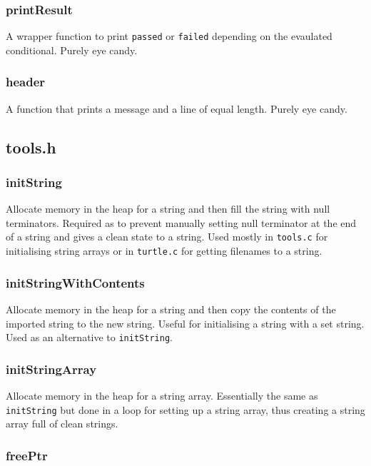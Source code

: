 \documentclass[a4paper, 12pt, titlepage]{article}
\newcommand{\code}[1]{\small\texttt{#1}\normalsize}
\begin{document}
\subsubsection{printResult}

A wrapper function to print \code{passed} or \code{failed} depending on the 
evaulated conditional. Purely eye candy.

\subsubsection{header}

A function that prints a message and a line of equal length. Purely eye candy.

\pagebreak
\subsection{tools.h}
\subsubsection{initString}

Allocate memory in the heap for a string and then fill the string with null 
terminators. Required as to prevent manually setting null terminator at the 
end of a string and gives a clean state to a string. Used mostly in 
\code{tools.c} for initialising string arrays or in \code{turtle.c} for 
getting filenames to a string.

\subsubsection{initStringWithContents}

Allocate memory in the heap for a string and then copy the contents of the 
imported string to the new string. Useful for initialising a string with a
set string. Used as an alternative to \code{initString}.

\subsubsection{initStringArray}

Allocate memory in the heap for a string array. Essentially the same as 
\code{initString} but done in a loop for setting up a string array, thus 
creating a string array full of clean strings.

\subsubsection{freePtr}
\end{document}
